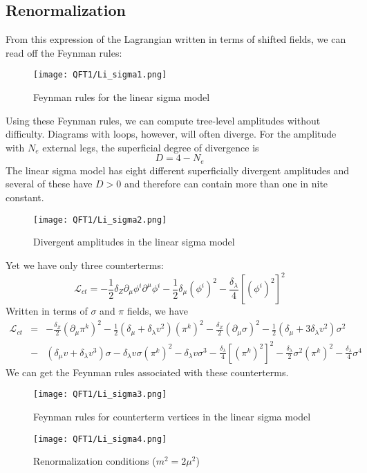 \documentclass[cyan]{elegantnote}
\begin{document}
\subsection{Renormalization}
From this expression of the Lagrangian written in terms of shifted fields, we can read off the Feynman rules:
\begin{figure}[!h]
\centering
\texttt{[image: QFT1/Li\_sigma1.png]}
\caption{Feynman rules for the linear sigma model}
\end{figure}

\noindent
Using these Feynman rules, we can compute tree-level amplitudes without difficulty. 
Diagrams with loops, however, will often diverge. For the amplitude with $N_e$ external legs, the superficial degree of divergence is
\[D = 4 - N_e\]
The linear sigma model has eight different superficially divergent amplitudes and several of these have $D > 0$ and therefore can contain more than one in nite constant.
\begin{figure}[!h]
\centering
\texttt{[image: QFT1/Li\_sigma2.png]}
\caption{Divergent amplitudes in the linear sigma model}
\end{figure}

\noindent
Yet we have only three counterterms:
\[\mathcal{L}_{ct} = -\frac{1}{2} \delta_Z \partial_{\mu} \phi^i \partial^{\mu}\phi^i - \frac{1}{2} \delta_{\mu} (\phi^i)^2 - \frac{\delta_{\lambda}}{4} [(\phi^i)^2]^2 \]
Written in terms of $\sigma$ and $\pi$ fields, we have
\begin{eqnarray}
\mathcal{L}_{ct} &=& -\frac{\delta_Z}{2}(\partial_{\mu}\pi^k)^2 - \frac{1}{2}(\delta_{\mu}+\delta_{\lambda}v^2)(\pi^k)^2 -\frac{\delta_Z}{2}(\partial_{\mu}\sigma)^2 - \frac{1}{2}(\delta_{\mu} + 3\delta_{\lambda}v^2)\sigma^2 \nonumber \\
&-& (\delta_{\mu}v + \delta_{\lambda}v^3)\sigma - \delta_{\lambda}v\sigma(\pi^k)^2 - \delta_{\lambda}v\sigma^3 - \frac{\delta_{\lambda}}{4}[(\pi^k)^2]^2 - \frac{\delta_{\lambda}}{2}\sigma^2 (\pi^k)^2 - \frac{\delta_{\lambda}}{4}\sigma^4 \nonumber
\end{eqnarray}
We can get the Feynman rules associated with these counterterms.
\begin{figure}[!h]
\centering
\texttt{[image: QFT1/Li\_sigma3.png]}
\caption{Feynman rules for counterterm vertices in the linear sigma model}
\end{figure}

\begin{figure}[!h]
\centering
\texttt{[image: QFT1/Li\_sigma4.png]}
\caption{Renormalization conditions ($m^2 = 2\mu^2$)}
\end{figure}
\end{document}
